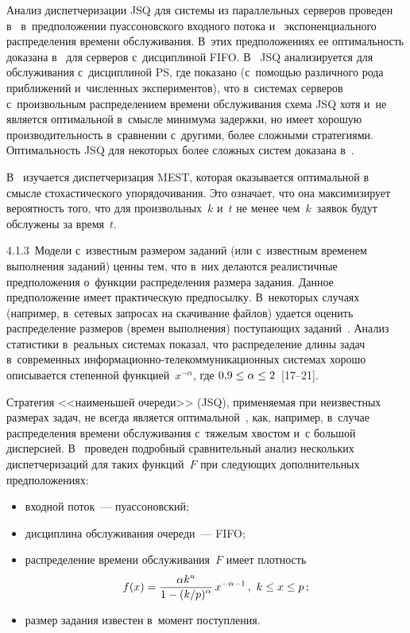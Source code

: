 \begin{multicols}{2}
    Анализ диспетчеризации JSQ для системы из параллельных серверов проведен 
в~\cite{13-kon, 14-kon} в~предположении пуассоновского входного потока и~
экспоненциального распределения времени обслуживания. В~этих предположениях ее 
оптимальность доказана в~\cite{11-kon} для серверов с~дисциплиной FIFO.  
В~\cite{16-kon} JSQ анализируется для обслуживания с~дисциплиной PS, 
где показано (с~по\-мощью различного рода приближений 
и~численных экспериментов), что в~системах серверов с~произвольным распределением 
времени обслуживания схема JSQ хотя и~не является оптимальной в~смысле минимума 
задержки, но имеет хорошую производительность в~сравнении с~другими, более 
сложными стратегиями. Оптимальность JSQ для некоторых более сложных систем 
доказана в~\cite{17-kon}.
    
    В~\cite{12-kon} изучается диспетчеризация MEST, которая оказывается оптимальной 
в смысле стохастического упорядочивания. Это означает, что она максимизи\-рует 
вероятность того, что для произвольных~$k$ и~$t$ не менее чем~$k$~заявок будут 
обслужены за время~$t$.
    
    \smallskip
    
    4.1.3\ Модели с~известным размером заданий (или с~известным временем выполнения 
заданий) ценны тем, что в~них делаются реалистичные предположения о~функции 
распределения размера задания. Данное предположение имеет практическую 
предпосылку. В~некоторых случаях (например, в~сетевых запросах на скачивание файлов) 
удается оценить распределение размеров (времен выполнения) поступающих 
заданий~\cite{19-kon}. Анализ статистики в~реальных сис\-те\-мах показал, что 
распределение длины задач в~современных информационно-те\-ле\-ком\-му\-ни\-ка\-ци\-он\-ных 
системах хорошо описывается степенной функцией~$x^{-\alpha}$, где $0{,}9\hm\leq 
\alpha \hm \leq 2$~[17--21].
    
    Стратегия <<наименьшей очереди>> (JSQ), применяемая при неизвестных размерах 
задач, не всегда является оптимальной~\cite{23-kon}, как, например, в~случае 
распределения времени обслуживания с~тяжелым хвостом и~с большой дисперсией. 
В~\cite{19-kon, 24-kon} проведен подробный сравнительный анализ нескольких 
диспетчеризаций для таких функций~$F$ при следующих дополнительных 
предположениях:
    \begin{itemize}
    \item  входной поток~--- пуассоновский;
    \item  дисциплина обслуживания очереди~--- FIFO;
    \item  распределение времени обслуживания~$F$ имеет плотность
    $$
    f(x) =\displaystyle\frac{\displaystyle \alpha k^u\mathstrut}{\displaystyle 1-(k/p)^\alpha\mathstrut}\,x^{-\alpha-1}\,,\ k\leq x\leq p\,;
    $$
    \item  размер задания известен в~момент поступления.
    \end{itemize}
    

\end{multicols}
